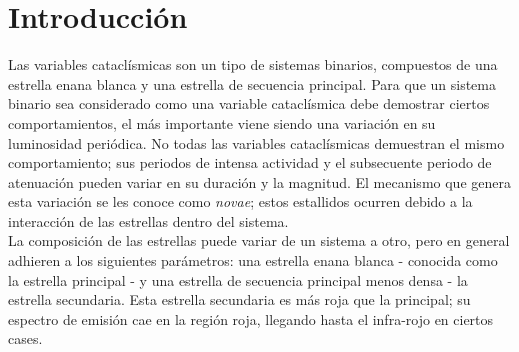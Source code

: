 \chapter{Introducción}

Las variables cataclísmicas son un tipo de sistemas binarios, compuestos de una estrella enana blanca y una estrella de secuencia principal. Para que un sistema binario sea considerado como una variable cataclísmica debe demostrar ciertos comportamientos, el más importante viene siendo una variación en su luminosidad periódica. No todas las variables cataclísmicas demuestran el mismo comportamiento; sus periodos de intensa actividad y el subsecuente periodo de atenuación pueden variar en su duración y la magnitud. El mecanismo que genera esta variación se les conoce como \textit{novae}; estos estallidos ocurren debido a la interacción de las estrellas dentro del sistema.
\\\newline
La composición de las estrellas puede variar de un sistema a otro, pero en general adhieren a los siguientes parámetros: una estrella enana blanca - conocida como la estrella principal - y una estrella de secuencia principal menos densa - la estrella secundaria. Esta estrella secundaria es más roja que la principal; su espectro de emisión cae en la región roja, llegando hasta el infra-rojo en ciertos cases.